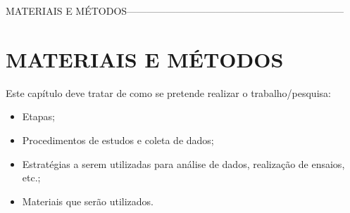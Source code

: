  MATERIAIS E MÉTODOS------------------------------------------------------------------

\chapter{MATERIAIS E MÉTODOS}
\label{chap:materiaisemetodos}

Este capítulo deve tratar de como se pretende realizar o trabalho/pesquisa:

\begin{itemize}
    \item Etapas;
    \item Procedimentos de estudos e coleta de dados;   
    \item Estratégias a serem utilizadas para análise de dados, realização de ensaios, etc.;
		\item Materiais que serão utilizados.
\end{itemize}